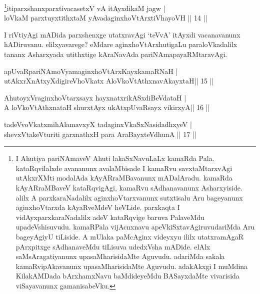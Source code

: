\begin{shl}
\footnote{I Ahutiya pariNAmaveV Ahuti lakaSxNavuLaLx kamaRda Pala.  kataRqvilalxde avananunx avalaMbisade I kamaRvu savxtaMtarxvAgi  utAkxrXMti modalAda kAyARraMBavanunx mADalAradu. kamaRda kAyARraMBaveV  kataRqvigAgi, kamaRvu sAdhanavanunx Asharxyiside. alilx A  parxkaraNadalilx aginxhoVtarxvanunx sutxtisalu Aru bageyanunx  aginxhoVtarxda kAyaRveMdeV heVLide. parxkaqta I vidAyxparxkaraNadalilx  adeV kataRqvige baruva PalaveMdu upadeVshisuvudu. kamaRPala  vijAcnxnavu apeVkiSxtavAgiruvudariMda Aru bageyAgiyU tiLiside. A  mUlaka paMcAginx videyxyu ililx utatxramAgaR pArxpitxge sAdhanaveMdu  tiLisuva udedxVsha mADide. elAlx saMsAragatiyanunx upasaMharisidaMte  Aguvudu. adariMda sakala kamaRvipAkavanunx upasaMharisidaMte Aguvudu.  adakAkxgi I muMdina KilakAMDada bArxhamxNavu baMdideyeMdu BASayxdaMte  vivarisida viSayavanunx gamanisabeVku.}itiparxshanxparxtivacasetxV vA itAyxdikaM jagw | \\
loVkaM parxtuyxtithxtaM yAvadaginxhoVtArxtiVhayoVH \hfill|| 14 || 
\end{shl}

\begin{artha}
I riVtiyAgi mADida parxshenxge utatxravAgi `teVvA' itAyxdi 
vacanavanunx hADiruvanu. elilxyavarege? eMdare aginxhoVtArxhutigaLu 
paraloVkadalilx tananx Asharxyada utithxtige kAraNavAda 
pariNAmapayaRMtaravAgi.
\end{artha}

\begin{shl}
apUvaRpariNAmoV\s yamaginxhoVtArxKayxkamaRNaH | \\
utAkxrXnAtxyXdigireVhoVkatx AloVkoVtAthxnavAkayxtaH\hfill ||  15 ||  
\end{shl}


\begin{shl}
AhutoyxVraginxhoVtarxsayx hayxnatxrikASxdiBeVdataH | \\
A loVkoVtAthxnataH shurxtAyx ukAtx\s pUvaRsayx vikirxyA\hfill ||  16 ||  
\end{shl}


\begin{shl}
tadeVvoVkatxmihA\s \s lamavxyX tadaginxVkaSxNasidadhxyeV | \\
shevxVtakeVturiti garxnathxH para AraBayxteV\s dhunA \hfill|| 17 || 
\end{shl}

